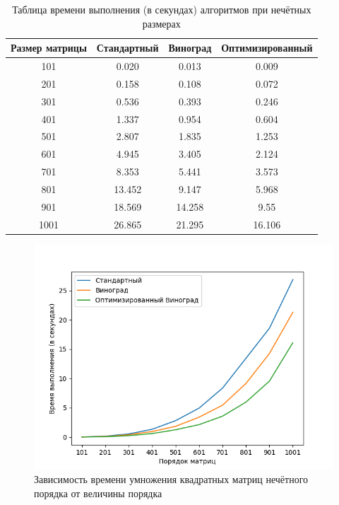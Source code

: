\documentclass[12pt]{report}
\begin{document}
\begin{table} [H]
	\label{timeOdd}
	\caption{Таблица времени выполнения (в секундах) алгоритмов при нечётных размерах}
	\begin{center}
		\begin{tabular}{|c c c c|} 
			\hline
			Размер матрицы & Стандартный & Виноград & Оптимизированный \\  
			\hline
			101 & 0.020 & 0.013 & 0.009 \\
			\hline
			201 & 0.158 & 0.108 & 0.072 \\
			\hline
			301 & 0.536 & 0.393 & 0.246 \\
			\hline
			401 & 1.337 & 0.954 & 0.604 \\
			\hline
			501 & 2.807 & 1.835 & 1.253 \\
			\hline
			601 & 4.945 & 3.405 & 2.124 \\
			\hline
			701 & 8.353 & 5.441 & 3.573 \\
			\hline
			801 & 13.452 & 9.147 & 5.968 \\
			\hline
			901 & 18.569 & 14.258 & 9.55 \\
			\hline
			1001 & 26.865 & 21.295 & 16.106 \\
			\hline
		\end{tabular}
	\end{center}
\end{table}

\begin{figure}[H]
	\centering
	\includegraphics[scale=0.8]{odd.png}
	\caption{Зависимость времени умножения квадратных матриц нечётного порядка от величины порядка}
	\label{oddGraph}
\end{figure}
\end{document}
